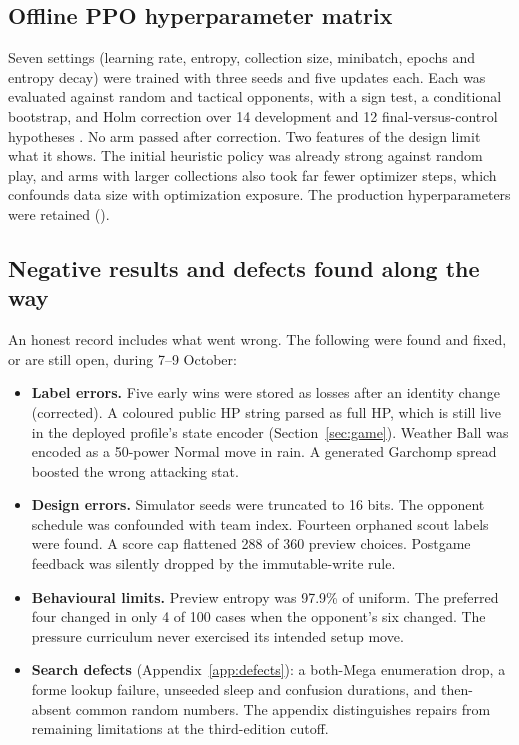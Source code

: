 \subsection{Offline PPO hyperparameter matrix}
Seven settings (learning rate, entropy, collection size, minibatch, epochs and
entropy decay) were trained with three seeds and five updates each. Each was
evaluated against random and tactical opponents, with a sign test, a
conditional bootstrap, and Holm correction over 14 development and 12
final-versus-control hypotheses \citep{holm}. No arm passed after correction.
Two features of the design limit what it shows. The initial heuristic policy
was already strong against random play, and arms with larger collections also
took far fewer optimizer steps, which confounds data size with optimization
exposure. The production hyperparameters were retained
().

\subsection{Negative results and defects found along the way}
An honest record includes what went wrong. The following were found and
fixed, or are still open, during 7--9 October:
\begin{itemize}
  \item \textbf{Label errors.} Five early wins were stored as losses after an
    identity change (corrected). A coloured public HP string parsed as full HP,
    which is still live in the deployed profile's state encoder
    (Section~\ref{sec:game}). Weather Ball was encoded as a 50-power Normal move
    in rain. A generated Garchomp spread boosted the wrong attacking stat.
  \item \textbf{Design errors.} Simulator seeds were truncated to 16 bits. The
    opponent schedule was confounded with team index. Fourteen orphaned scout
    labels were found. A score cap flattened 288 of 360 preview choices.
    Postgame feedback was silently dropped by the immutable-write rule.
  \item \textbf{Behavioural limits.} Preview entropy was 97.9\% of uniform. The
    preferred four changed in only 4 of 100 cases when the opponent's six
    changed. The pressure curriculum never exercised its intended setup move.
  \item \textbf{Search defects} (Appendix~\ref{app:defects}): a both-Mega
    enumeration drop, a forme lookup failure, unseeded sleep and confusion
    durations, and then-absent common random numbers. The appendix distinguishes
    repairs from remaining limitations at the third-edition cutoff.
\end{itemize}
